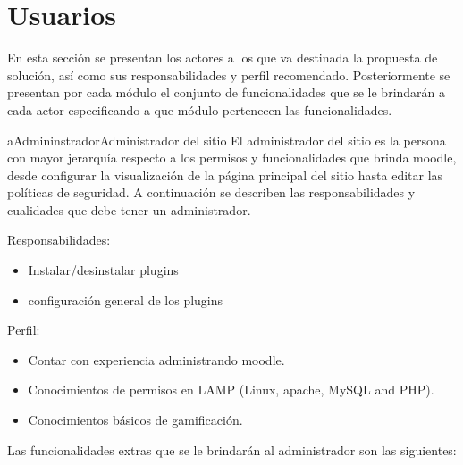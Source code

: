\section{Usuarios}
\label{analisis:usuarios}

 En esta sección se presentan los actores a los que va destinada la propuesta de
 solución, así como sus responsabilidades y perfil recomendado. Posteriormente se
 presentan por cada módulo el conjunto de funcionalidades que se le brindarán a
 cada actor especificando a que módulo pertenecen las funcionalidades.


    \begin{actor}{aAdmininstrador}{Administrador del sitio}{%
    El administrador del sitio es la persona con mayor jerarquía respecto a los
    permisos y funcionalidades que brinda moodle, desde configurar la visualización
    de la página principal del sitio hasta editar las políticas de seguridad. A
    continuación se describen las responsabilidades y cualidades que debe tener
    un administrador.\\}

    \item[Responsabilidades:] \hfill
        \begin{itemize}
        \item Instalar/desinstalar plugins
        \item configuración general de los plugins
        \end{itemize}

    \item[Perfil:] \hfill
        \begin{itemize}
        \item Contar con experiencia administrando moodle.
        \item Conocimientos de permisos en LAMP (Linux, apache, MySQL and PHP).
        \item Conocimientos básicos de gamificación.\\
        \end{itemize}
    \end{actor}

    \noindent
    Las funcionalidades extras que se le brindarán al administrador son las siguientes:

